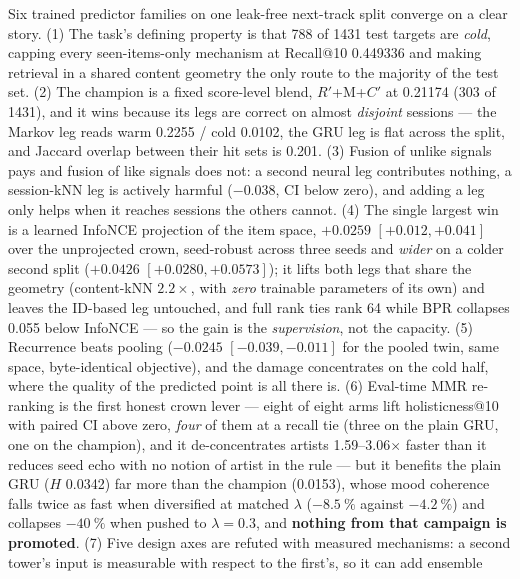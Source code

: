 \documentclass[11pt]{article}
\newcommand{\Rp}{\ensuremath{R'}}
\newcommand{\Cp}{\ensuremath{C'}}
\begin{document}
Six trained predictor families on one leak-free next-track split converge on a
clear story. (1) The task's defining property is that \num{788} of \num{1431}
test targets are \emph{cold}, capping every seen-items-only mechanism at
Recall@10 \num{0.449336} and making retrieval in a shared content geometry the
only route to the majority of the test set. (2) The champion is a fixed
score-level blend, \Rp+M+\Cp{} at \num{0.21174} (\num{303} of \num{1431}), and it
wins because its legs are correct on almost \emph{disjoint} sessions --- the
Markov leg reads warm \num{0.2255} / cold \num{0.0102}, the GRU leg is flat
across the split, and Jaccard overlap between their hit sets is \num{0.201}. (3)
Fusion of unlike signals pays and fusion of like signals does not: a second
neural leg contributes nothing, a session-kNN leg is actively harmful
($-\num{0.038}$, CI below zero), and adding a leg only helps when it reaches
sessions the others cannot. (4) The single largest win is a learned InfoNCE
projection of the item space, ${+}\num{0.0259}$
$[+\num{0.012},+\num{0.041}]$ over the unprojected crown, seed-robust across
three seeds and \emph{wider} on a colder second split
(${+}\num{0.0426}$ $[+\num{0.0280},+\num{0.0573}]$); it lifts both legs that
share the geometry (content-kNN $2.2\times$, with \emph{zero} trainable
parameters of its own) and leaves the ID-based leg untouched, and full rank ties
rank 64 while BPR collapses \num{0.055} below InfoNCE --- so the gain is the
\emph{supervision}, not the capacity. (5) Recurrence beats pooling
($-\num{0.0245}$ $[-\num{0.039},-\num{0.011}]$ for the pooled twin, same space,
byte-identical objective), and the damage concentrates on the cold half, where
the quality of the predicted point is all there is. (6) Eval-time MMR re-ranking
is the first honest crown lever --- eight of eight arms lift holisticness@10 with
paired CI above zero, \emph{four} of them at a recall tie (three on the plain GRU,
one on the champion), and it de-concentrates artists
\numrange{1.59}{3.06}$\times$ faster than it reduces seed echo with no notion of
artist in the rule --- but it benefits the plain GRU ($H$ \num{0.0342}) far more
than the champion (\num{0.0153}), whose mood coherence falls twice as fast when
diversified at matched $\lambda$ ($-\SI{8.5}{\percent}$ against
$-\SI{4.2}{\percent}$) and collapses $-\SI{40}{\percent}$ when pushed to
$\lambda=\num{0.3}$, and \textbf{nothing from that campaign is promoted}. (7) Five design axes are refuted with measured mechanisms: a second
tower's input is measurable with respect to the first's, so it can add ensemble
\end{document}
